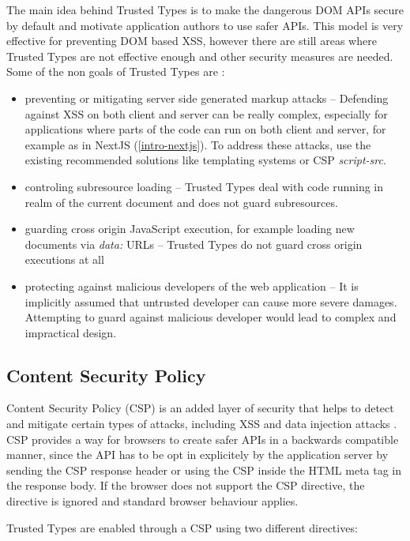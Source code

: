 The main idea behind Trusted Types is to make the dangerous DOM APIs secure by default and motivate
application authors to use safer APIs. This model is very effective for preventing DOM based XSS,
however there are still areas where Trusted Types are not effective enough and other security
measures are needed. Some of the non goals of Trusted Types are \cite{tt_spec:non_goals}:

\begin{itemize}
  \item preventing or mitigating server side generated markup attacks -- Defending against XSS on
        both client and server can be really complex, especially for applications where parts of the
        code can run on both client and server, for example as in NextJS (\ref{intro-nextjs}). To
        address these attacks, use the existing recommended solutions like templating systems or CSP
        \emph{script-src}.
  \item controling subresource loading -- Trusted Types deal with code running in realm of the
        current document and does not guard subresources.
  \item guarding cross origin JavaScript execution, for example loading new documents via
        \emph{data:} URLs -- Trusted Types do not guard cross origin executions at all
  \item protecting against malicious developers of the web application -- It is implicitly assumed
        that untrusted developer can cause more severe damages. Attempting to guard against
        malicious developer would lead to complex and impractical design.
\end{itemize}

\subsection{Content Security Policy}
\label{csp}

Content Security Policy (CSP) is an added layer of security that helps to detect and mitigate
certain types of attacks, including XSS and data injection attacks \cite{mdn_csp_def}. CSP provides
a way for browsers to create safer APIs in a backwards compatible manner, since the API has to be
opt in explicitely by the application server by sending the CSP response header or using the CSP
inside the HTML meta tag in the response body. If the browser does not support the CSP directive,
the directive is ignored and standard browser behaviour applies.

Trusted Types are enabled through a CSP using two different directives:

